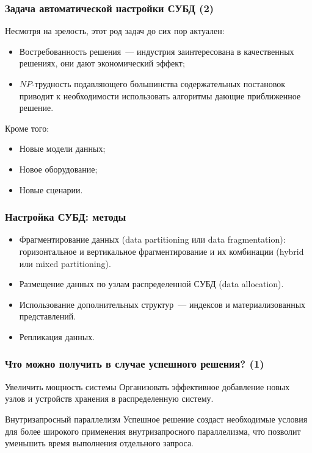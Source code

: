 \documentclass[unicode]{beamer}
\begin{document}
\begin{frame}
\frametitle{Задача автоматической настройки СУБД (2)}

Несмотря на зрелость, этот род задач до сих пор актуален:

\begin{itemize}
  \setlength\itemsep{1em}	
  \item Востребованность решения~--- индустрия заинтересована в качественных решениях, они дают экономический эффект;
  \item $NP$-трудность подавляющего большинства содержательных постановок приводит к необходимости использовать алгоритмы дающие приближенное решение.
\end{itemize}

Кроме того:

\begin{itemize}
  \setlength\itemsep{1em}	
  \item Новые модели данных;
  \item Новое оборудование;
  \item Новые сценарии.
\end{itemize}

\end{frame}

\begin{frame}
\frametitle{Настройка СУБД: методы}

\begin{itemize}
  \setlength\itemsep{1em}	
  \item Фрагментирование данных (data partitioning или data fragmentation): горизонтальное и вертикальное фрагментирование и их комбинации (hybrid или mixed partitioning).
  \item Размещение данных по узлам распределенной СУБД (data allocation). 
  \item Использование дополнительных структур~--- индексов и материализованных представлений. 
  \item Репликация данных. 
\end{itemize}

\end{frame}

\begin{frame}
\frametitle{Что можно получить в случае успешного решения? (1)}

\begin{block}{Увеличить мощность системы}
Организовать эффективное добавление новых узлов и устройств хранения в распределенную систему.
\end{block}

\begin{block}{Внутризапросный параллелизм}
Успешное решение создаст необходимые условия для более широкого применения внутризапросного параллелизма, что позволит уменьшить время выполнения отдельного запроса.
\end{block}

\end{frame}
\end{document}
